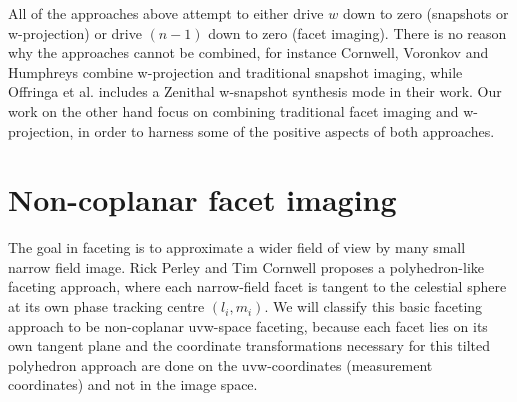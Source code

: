 All of the approaches above attempt to either drive $w$ down to zero (snapshots or w-projection) or drive $(n-1)$ down to zero (facet imaging). There is no reason why
the approaches cannot be combined, for instance Cornwell, Voronkov and Humphreys \cite{cornwell2012wide} combine w-projection and traditional snapshot imaging, while
Offringa et al. includes a Zenithal w-snapshot synthesis mode in their work. Our work on the other hand focus on combining traditional facet imaging and w-projection, 
in order to harness some of the positive aspects of both approaches.

\section{Non-coplanar facet imaging}
The goal in faceting is to approximate a wider field of view by many small narrow field image. Rick Perley and Tim Cornwell \cite{cornwell1992radio} proposes a 
polyhedron-like faceting approach, where each narrow-field facet is tangent to the celestial sphere at its own phase tracking centre $(l_i,m_i)$. We will classify
this basic faceting approach to be non-coplanar uvw-space faceting, because each facet lies on its own tangent plane and the coordinate transformations
necessary for this tilted polyhedron approach are done on the uvw-coordinates (measurement coordinates) and not in the image space.


